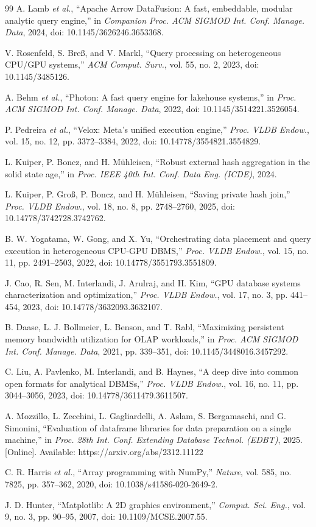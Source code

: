 \documentclass[conference,a4paper]{IEEEtran}
\begin{document}
\begin{thebibliography}{99}
A. Lamb \emph{et al.}, ``Apache Arrow DataFusion: A fast, embeddable, modular analytic query engine,'' in \emph{Companion Proc. ACM SIGMOD Int. Conf. Manage. Data}, 2024, doi: 10.1145/3626246.3653368.

V. Rosenfeld, S. Bre\ss, and V. Markl, ``Query processing on heterogeneous CPU/GPU systems,'' \emph{ACM Comput. Surv.}, vol. 55, no. 2, 2023, doi: 10.1145/3485126.

A. Behm \emph{et al.}, ``Photon: A fast query engine for lakehouse systems,'' in \emph{Proc. ACM SIGMOD Int. Conf. Manage. Data}, 2022, doi: 10.1145/3514221.3526054.

P. Pedreira \emph{et al.}, ``Velox: Meta's unified execution engine,'' \emph{Proc. VLDB Endow.}, vol. 15, no. 12, pp. 3372--3384, 2022, doi: 10.14778/3554821.3554829.

L. Kuiper, P. Boncz, and H. M\"uhleisen, ``Robust external hash aggregation in the solid state age,'' in \emph{Proc. IEEE 40th Int. Conf. Data Eng. (ICDE)}, 2024.

L. Kuiper, P. Gro\ss, P. Boncz, and H. M\"uhleisen, ``Saving private hash join,'' \emph{Proc. VLDB Endow.}, vol. 18, no. 8, pp. 2748--2760, 2025, doi: 10.14778/3742728.3742762.

B. W. Yogatama, W. Gong, and X. Yu, ``Orchestrating data placement and query execution in heterogeneous CPU-GPU DBMS,'' \emph{Proc. VLDB Endow.}, vol. 15, no. 11, pp. 2491--2503, 2022, doi: 10.14778/3551793.3551809.

J. Cao, R. Sen, M. Interlandi, J. Arulraj, and H. Kim, ``GPU database systems characterization and optimization,'' \emph{Proc. VLDB Endow.}, vol. 17, no. 3, pp. 441--454, 2023, doi: 10.14778/3632093.3632107.

B. Daase, L. J. Bollmeier, L. Benson, and T. Rabl, ``Maximizing persistent memory bandwidth utilization for OLAP workloads,'' in \emph{Proc. ACM SIGMOD Int. Conf. Manage. Data}, 2021, pp. 339--351, doi: 10.1145/3448016.3457292.

C. Liu, A. Pavlenko, M. Interlandi, and B. Haynes, ``A deep dive into common open formats for analytical DBMSs,'' \emph{Proc. VLDB Endow.}, vol. 16, no. 11, pp. 3044--3056, 2023, doi: 10.14778/3611479.3611507.

A. Mozzillo, L. Zecchini, L. Gagliardelli, A. Aslam, S. Bergamaschi, and G. Simonini, ``Evaluation of dataframe libraries for data preparation on a single machine,'' in \emph{Proc. 28th Int. Conf. Extending Database Technol. (EDBT)}, 2025. [Online]. Available: https://arxiv.org/abs/2312.11122

C. R. Harris \emph{et al.}, ``Array programming with NumPy,'' \emph{Nature}, vol. 585, no. 7825, pp. 357--362, 2020, doi: 10.1038/s41586-020-2649-2.

J. D. Hunter, ``Matplotlib: A 2D graphics environment,'' \emph{Comput. Sci. Eng.}, vol. 9, no. 3, pp. 90--95, 2007, doi: 10.1109/MCSE.2007.55.

\end{thebibliography}
\end{document}
